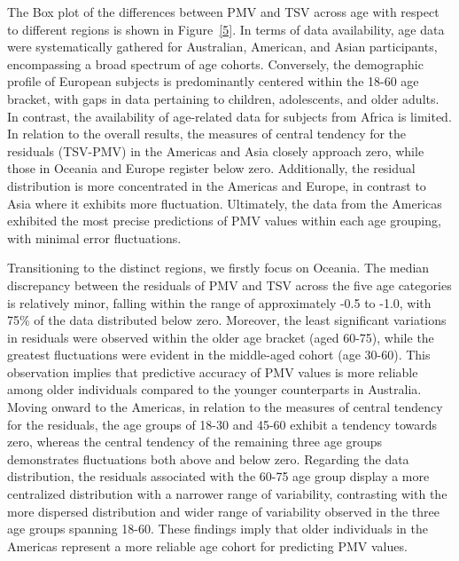 \documentclass[final,3p,times,12pt]{elsarticle}
\begin{document}
The Box plot of the differences between PMV and TSV across age with respect to different regions is shown in Figure~\ref{5}. In terms of data availability, age data were systematically gathered for Australian, American, and Asian participants, encompassing a broad spectrum of age cohorts. Conversely, the demographic profile of European subjects is predominantly centered within the 18-60 age bracket, with gaps in data pertaining to children, adolescents, and older adults. In contrast, the availability of age-related data for subjects from Africa is limited. In relation to the overall results, the measures of central tendency for the residuals (TSV-PMV) in the Americas and Asia closely approach zero, while those in Oceania and Europe register below zero. Additionally, the residual distribution is more concentrated in the Americas and Europe, in contrast to Asia where it exhibits more fluctuation. Ultimately, the data from the Americas exhibited the most precise predictions of PMV values within each age grouping, with minimal error fluctuations.

Transitioning to the distinct regions, we firstly focus on Oceania. The median discrepancy between the residuals of PMV and TSV across the five age categories is relatively minor, falling within the range of approximately -0.5 to -1.0, with 75\% of the data distributed below zero. Moreover, the least significant variations in residuals were observed within the older age bracket (aged 60-75), while the greatest fluctuations were evident in the middle-aged cohort (age 30-60). This observation implies that predictive accuracy of PMV values is more reliable among older individuals compared to the younger counterparts in Australia. Moving onward to the Americas, in relation to the measures of central tendency for the residuals, the age groups of 18-30 and 45-60 exhibit a tendency towards zero, whereas the central tendency of the remaining three age groups demonstrates fluctuations both above and below zero. Regarding the data distribution, the residuals associated with the 60-75 age group display a more centralized distribution with a narrower range of variability, contrasting with the more dispersed distribution and wider range of variability observed in the three age groups spanning 18-60. These findings imply that older individuals in the Americas represent a more reliable age cohort for predicting PMV values.
\end{document}
